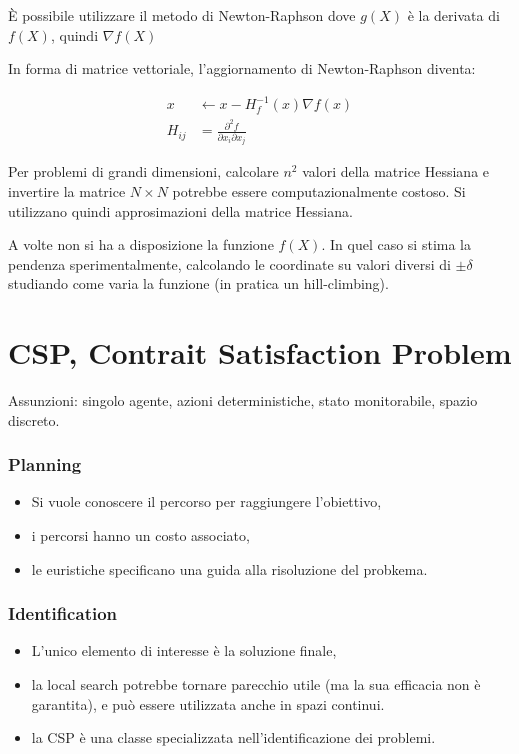 \documentclass[12pt, a4paper]{article}
\begin{document}
È possibile utilizzare il metodo di Newton-Raphson dove $g(X)$ è la derivata di $f(X)$, quindi $\nabla f(X)$

In forma di matrice vettoriale, l'aggiornamento di Newton-Raphson diventa:

\begin{align*}
  x & \leftarrow x - H_f^{-1}(x)\nabla f(x) \\
  H_{ij} &= \frac{\partial^2 f}{\partial x_i \partial x_j}
\end{align*}

Per problemi di grandi dimensioni, calcolare $n^2$ valori della matrice Hessiana e invertire la matrice $N\times N$ potrebbe essere computazionalmente costoso. Si utilizzano quindi approsimazioni della matrice Hessiana.

A volte non si ha a disposizione la funzione $f(X)$. In quel caso si stima la pendenza sperimentalmente, calcolando le coordinate su valori diversi di $\pm\delta$ studiando come varia la funzione (in pratica un hill-climbing).

\section{CSP, Contrait Satisfaction Problem}

Assunzioni: singolo agente, azioni deterministiche, stato monitorabile, spazio discreto.

\subsubsection*{Planning}

\begin{itemize}
  \item Si vuole conoscere il percorso per raggiungere l'obiettivo,
  \item i percorsi hanno un costo associato,
  \item le euristiche specificano una guida alla risoluzione del probkema.
\end{itemize}

\subsubsection*{Identification}

\begin{itemize}
  \item L'unico elemento di interesse è la soluzione finale,
  \item la local search potrebbe tornare parecchio utile (ma la sua efficacia non è garantita), e può essere utilizzata anche in spazi continui.
  \item la CSP è una classe specializzata nell'identificazione dei problemi.
\end{itemize}
\end{document}
